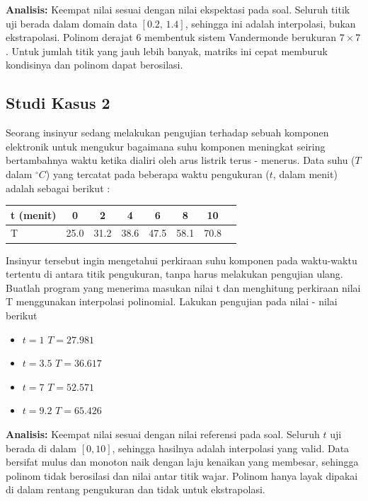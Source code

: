 \documentclass[12pt,a4paper]{report}
\begin{document}
\textbf{Analisis:} Keempat nilai sesuai dengan nilai ekspektasi pada soal. Seluruh titik uji berada dalam domain data $[0.2,\,1.4]$, sehingga ini adalah interpolasi, bukan ekstrapolasi. Polinom derajat 6 membentuk sistem Vandermonde berukuran $7\times7$. Untuk jumlah titik yang jauh lebih banyak, matriks ini cepat memburuk kondisinya dan polinom dapat berosilasi.

\subsection{Studi Kasus 2}

Seorang insinyur sedang melakukan pengujian terhadap sebuah komponen elektronik untuk mengukur
bagaimana suhu komponen meningkat seiring bertambahnya waktu ketika dialiri oleh arus listrik terus
- menerus. Data suhu ($T$ dalam $^\circ C$) yang tercatat pada beberapa waktu pengukuran ($t$, dalam menit)
adalah sebagai berikut :
 
\begin{center}
\begin{tabular}{|l|ccccccc|}
    \hline
    t (menit)    & 0   & 2   & 4  & 6 & 8   & 10    \\
    \hline
    T & 25.0 & 31.2 & 38.6 & 47.5 & 58.1 & 70.8 \\
    \hline
\end{tabular}
\end{center}

Insinyur tersebut ingin mengetahui perkiraan suhu komponen pada waktu-waktu tertentu di antara titik
pengukuran, tanpa harus melakukan pengujian ulang. Buatlah program yang menerima masukan nilai
t dan menghitung perkiraan nilai T menggunakan interpolasi polinomial.
Lakukan pengujian pada nilai - nilai berikut

\begin{itemize}
    \item $t = 1$ $T = 27.981$
    \item $t = 3.5$ $T = 36.617$
    \item $t = 7$ $T = 52.571$
    \item $t = 9.2$ $T = 65.426$
\end{itemize} 

\textbf{Analisis:} Keempat nilai sesuai dengan nilai referensi pada soal. Seluruh $t$ uji berada di dalam $[0,10]$, sehingga hasilnya adalah interpolasi yang valid. Data bersifat mulus dan monoton naik dengan laju kenaikan yang membesar, sehingga polinom tidak berosilasi dan nilai antar titik wajar. Polinom hanya layak dipakai di dalam rentang pengukuran dan tidak untuk ekstrapolasi.
\end{document}
